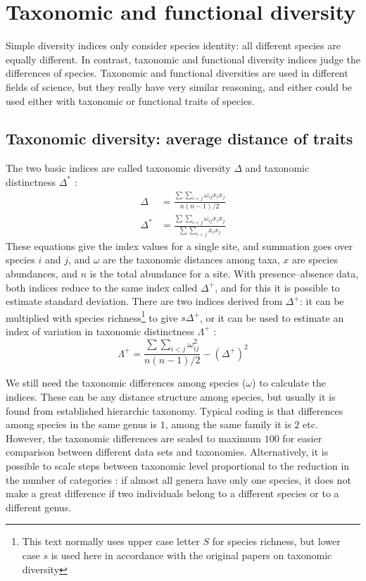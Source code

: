 \documentclass[a4paper,10pt,twocolumn]{article}
\begin{document}
\section{Taxonomic and functional diversity}

Simple diversity indices only consider species identity: all different
species are equally different. In contrast, taxonomic and functional
diversity indices judge the differences of species. Taxonomic and
functional diversities are used in different fields of science, but
they really have very similar reasoning, and either could be used
either with taxonomic or functional traits of species.

\subsection{Taxonomic diversity: average distance of traits}

The two basic indices are called taxonomic diversity $\Delta$ and
taxonomic distinctness $\Delta^*$ \citep{ClarkeWarwick98}:
\begin{align}
  \Delta &= \frac{\sum \sum_{i<j} \omega_{ij} x_i x_j}{n (n-1) / 2}\\
\Delta^* &= \frac{\sum \sum_{i<j} \omega_{ij} x_i x_j}{\sum \sum_{i<j} x_i x_j}
\end{align}
These equations give the index values for a single site, and summation
goes over species $i$ and $j$, and $\omega$ are the taxonomic
distances among taxa, $x$ are species abundances, and $n$ is the total
abundance for a site.  With presence--absence data, both indices
reduce to the same index called $\Delta^+$, and for this it is
possible to estimate standard deviation. There are two indices
derived from $\Delta^+$: it can be multiplied with species
richness\footnote{This text normally uses upper case letter $S$ for
  species richness, but lower case $s$ is used here in accordance with
  the original papers on taxonomic diversity}
to give $s \Delta^+$, or it can be used to estimate an index of
variation in taxonomic distinctness $\Lambda^+$ \citep{ClarkeWarwick01}:
\begin{equation}
  \Lambda^+ = \frac{\sum \sum_{i<j} \omega_{ij}^2}{n (n-1) / 2} - (\Delta^+)^2
\end{equation}

We still need the taxonomic differences among species ($\omega$) to
calculate the indices. These can be any distance structure among
species, but usually it is found from established hierarchic
taxonomy. Typical coding is that differences among species in the same
genus is $1$, among the same family it is $2$ etc. However, the
taxonomic differences are scaled to maximum $100$ for easier
comparison between different data sets and taxonomies. Alternatively,
it is possible to scale steps between taxonomic level proportional to
the reduction in the number of categories \citep{ClarkeWarwick99}: if
almost all genera have only one species, it does not make a great
difference if two individuals belong to a different species or to a
different genus.
\end{document}
